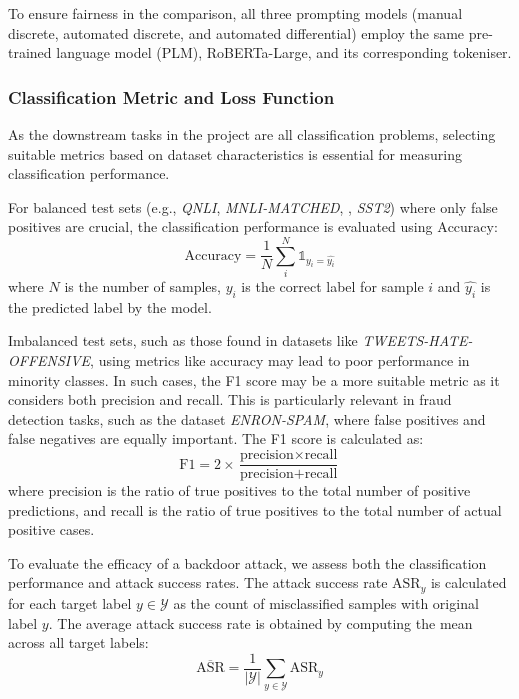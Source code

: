 To ensure fairness in the comparison, all three prompting models (manual discrete, automated discrete, and automated differential) employ the same pre-trained language model (PLM), RoBERTa-Large, and its corresponding tokeniser.

\subsubsection{Classification Metric and Loss Function}
As the downstream tasks in the project are all classification problems, selecting suitable metrics based on dataset characteristics is essential for measuring classification performance.

For balanced test sets (e.g., \textit{QNLI}, \textit{MNLI-MATCHED}, , \textit{SST2}) where only false positives are crucial, the classification performance is evaluated using $\text{Accuracy}$:
\begin{equation}
    \text{Accuracy} = \frac{1}{N} \sum_{i}^N \mathds{1}_{y_i = \hat{y_i}}
\end{equation}
where $N$ is the number of samples, $y_i$ is the correct label for sample $i$ and $\hat{y_i}$ is the predicted label by the model.

Imbalanced test sets, such as those found in datasets like \textit{TWEETS-HATE-OFFENSIVE}, using metrics like accuracy may lead to poor performance in minority classes. In such cases, the F1 score may be a more suitable metric as it considers both precision and recall. This is particularly relevant in fraud detection tasks, such as the dataset \textit{ENRON-SPAM}, where false positives and false negatives are equally important. The F1 score is calculated as:
\begin{equation}
    \text{F1} = 2 \times \frac{\text{precision} \times \text{recall}}{\text{precision} + \text{recall}}
\end{equation}
where precision is the ratio of true positives to the total number of positive predictions, and recall is the ratio of true positives to the total number of actual positive cases.

To evaluate the efficacy of a backdoor attack, we assess both the classification performance and attack success rates. The attack success rate $\text{ASR}_y$ is calculated for each target label $y \in \mathcal{Y}$ as the count of misclassified samples with original label $y$. The average attack success rate is obtained by computing the mean across all target labels:
\begin{equation}
    \overline{\text{ASR}} = \frac{1}{|\mathcal{Y}|} \sum_{y \in \mathcal{Y}} \text{ASR}_y
\end{equation}

